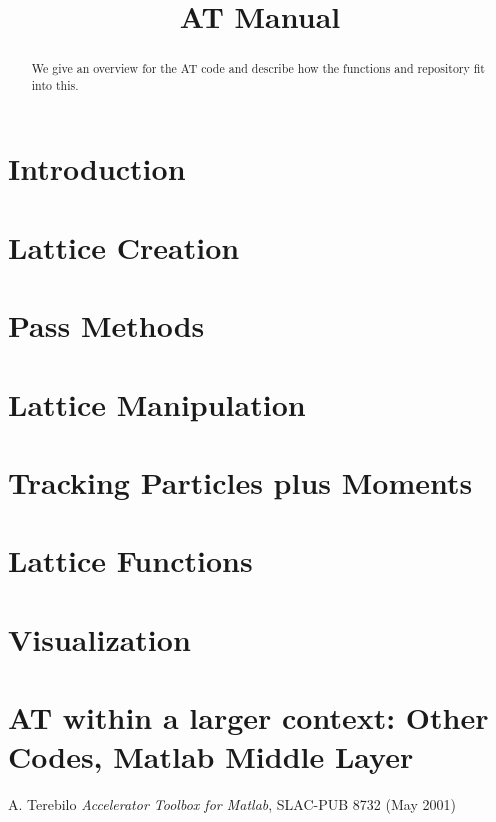 \documentclass[acus]{article}
\begin{document}
\title{AT Manual}
\maketitle
\begin{abstract}
We give an overview for the AT code and describe how the functions and repository fit into this.
\end{abstract}


\section{Introduction}

\section{Lattice Creation}



\section{Pass Methods}

\section{Lattice Manipulation}

\section{Tracking Particles plus Moments}

\section{Lattice Functions}

\section{Visualization}

\section{AT within a larger context: Other Codes, Matlab Middle Layer}

\begin{thebibliography}{2}

A. Terebilo \emph{Accelerator Toolbox for Matlab}, SLAC-PUB 8732 (May 2001)

\end{thebibliography}
\end{document}
